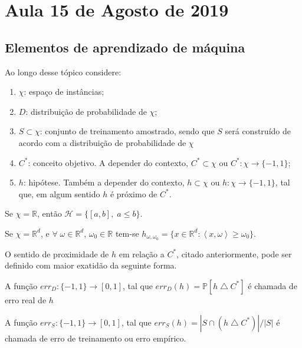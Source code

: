 \section{Aula 15 de Agosto de 2019}
\label{2019_08_15}

\subsection{Elementos de aprendizado de máquina}
Ao longo desse tópico considere:
\begin{enumerate}
    \item $\chi$: espaço de instâncias;
    \item $D$: distribuição de probabilidade de $\chi$;
    \item $S \subset \chi$: conjunto de treinamento amostrado, sendo que $S$ será construído de acordo com a distribuição de probabilidade de $\chi$
    \item $C^*$: conceito objetivo. A depender do contexto, $C^* \subset \chi$ ou $C^*: \chi \rightarrow \{-1,1\}$;
    \item $h$: hipótese. Também a depender do contexto, $h \subset \chi$ ou $h: \chi \rightarrow \{-1,1\}$, tal que, em algum sentido $h$ é próximo de $C^*$.
\end{enumerate}{}

\begin{exemplo}
Se $\chi = \mathbb{R}$, então $\mathcal{H} = \{[a,b],\;a\leq b\}$.
\end{exemplo}{}

\begin{exemplo}
Se $\chi = \mathbb{R}^d$,  e $\forall \; \omega \in \mathbb{R}^d$, $\omega_0 \in \mathbb{R}$ tem-se $h_{\omega, \omega_0} = \{x \in \mathbb{R}^d : \left< x, \omega\right> \geq \omega_0\}$.
\end{exemplo}{}

O sentido de proximidade de $h$ em relação a $C^*$, citado anteriormente, pode ser definido com maior exatidão da seguinte forma.
\begin{definicao}
A função $err_D: \{-1,1\}  \rightarrow [0,1]$, tal que $err_D(h) = \mathbb{P}[h \bigtriangleup C^*]$ é chamada de erro real de $h$
\end{definicao}{}

\begin{definicao}
A função $err_S: \{-1,1\}  \rightarrow [0,1]$, tal que $err_S(h) = | S \cap (h \bigtriangleup C^*)| / |S|$ é chamada de erro de treinamento ou erro empírico.
\end{definicao}{}

